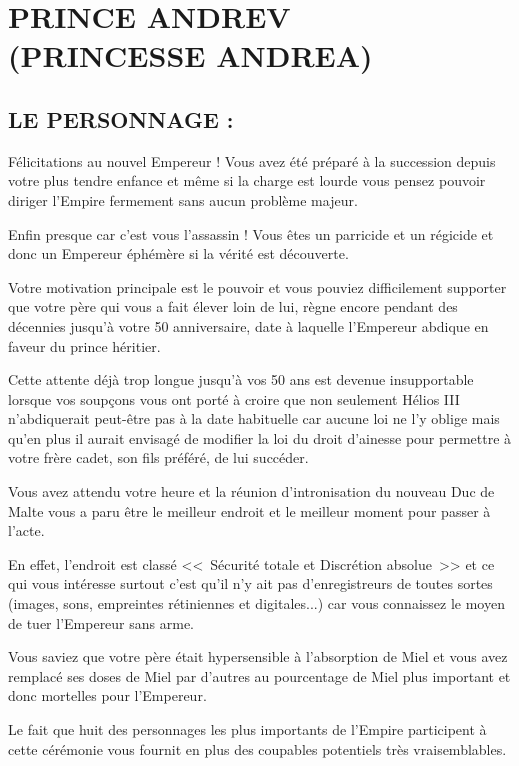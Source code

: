 \documentclass[14pt,twocolumn]{extarticle}
\begin{document}
\section{PRINCE ANDREV\\(PRINCESSE ANDREA)}

\subsection{LE PERSONNAGE :}

Félicitations au nouvel Empereur ! Vous avez été préparé à la succession depuis
votre plus tendre enfance et même si la charge est lourde vous pensez pouvoir
diriger l'Empire fermement sans aucun problème majeur.

Enfin presque car c'est vous l'assassin ! Vous êtes un parricide et un régicide
et donc un Empereur éphémère si la vérité est découverte.

Votre motivation principale est le pouvoir et vous pouviez difficilement
supporter que votre père qui vous a fait élever loin de lui, règne encore
pendant des décennies jusqu'à votre 50 anniversaire, date à laquelle 
l'Empereur abdique en faveur du prince héritier.

Cette attente déjà trop longue jusqu'à vos 50 ans est devenue insupportable
lorsque vos soupçons vous ont porté à croire que non seulement Hélios III
n'abdiquerait peut-être pas à la date habituelle car aucune loi ne l'y oblige
mais qu'en plus il aurait envisagé de modifier la loi du droit d'ainesse pour
permettre à votre frère cadet, son fils préféré, de lui succéder.

Vous avez attendu votre heure et la réunion d'intronisation du nouveau Duc de
Malte vous a paru être le meilleur endroit et le meilleur moment pour passer à
l'acte.

En effet, l'endroit est classé <<~Sécurité totale et Discrétion absolue~>> et
ce qui vous intéresse surtout c'est qu'il n'y ait pas d'enregistreurs de toutes
sortes (images, sons, empreintes rétiniennes et digitales...) car vous
connaissez le moyen de tuer l'Empereur sans arme.

Vous saviez que votre père était hypersensible à l'absorption de Miel et vous
avez remplacé ses doses de Miel par d'autres au pourcentage de Miel plus
important et donc mortelles pour l'Empereur.

Le fait que huit des personnages les plus importants de l'Empire participent à
cette cérémonie vous fournit en plus des coupables potentiels très
vraisemblables.
\end{document}
